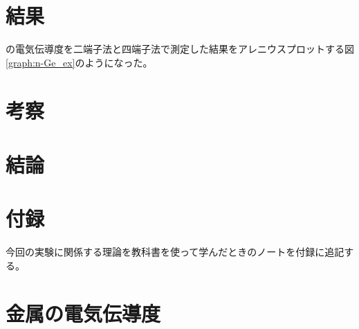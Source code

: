 \documentclass[11pt,dvipdfmx,a4paper]{jsarticle}
\begin{document}
\section{結果}
 の電気伝導度を二端子法と四端子法で測定した結果をアレニウスプロットする図\ref{graph:n-Ge_ex}のようになった。



\section{考察}

\section{結論}





\section*{付録}
今回の実験に関係する理論を教科書\cite{ibach-luth}を使って学んだときのノートを付録に追記する。
\section{金属の電気伝導度}
\end{document}
